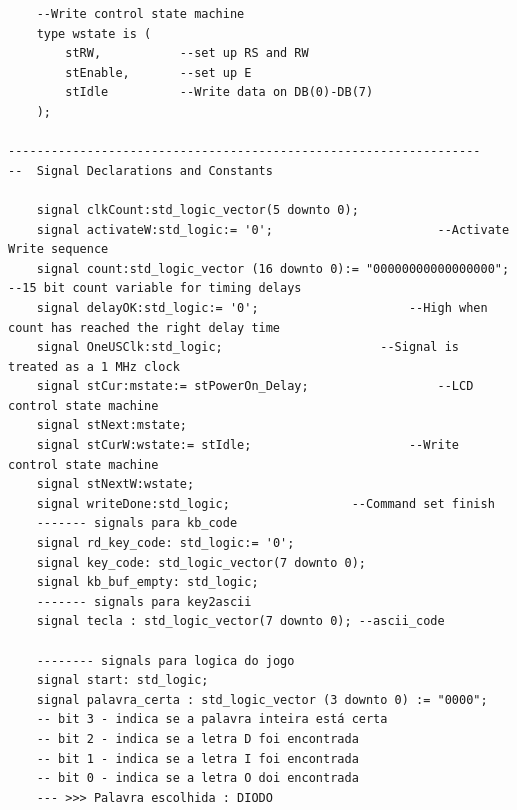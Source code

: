\documentclass[a4paper,12pt,twoside]{article}
\begin{document}
\begin{lstlisting}
	--Write control state machine
	type wstate is (
		stRW,			--set up RS and RW
		stEnable,		--set up E
		stIdle			--Write data on DB(0)-DB(7)
	);

------------------------------------------------------------------
--  Signal Declarations and Constants

    signal clkCount:std_logic_vector(5 downto 0);
    signal activateW:std_logic:= '0';		    			--Activate Write sequence
    signal count:std_logic_vector (16 downto 0):= "00000000000000000";	--15 bit count variable for timing delays
    signal delayOK:std_logic:= '0';						--High when count has reached the right delay time
    signal OneUSClk:std_logic;						--Signal is treated as a 1 MHz clock	
    signal stCur:mstate:= stPowerOn_Delay;					--LCD control state machine
    signal stNext:mstate;			  	
    signal stCurW:wstate:= stIdle; 						--Write control state machine
    signal stNextW:wstate;
    signal writeDone:std_logic;					--Command set finish
    ------- signals para kb_code
    signal rd_key_code: std_logic:= '0';
    signal key_code: std_logic_vector(7 downto 0);
    signal kb_buf_empty: std_logic;
	------- signals para key2ascii
    signal tecla : std_logic_vector(7 downto 0); --ascii_code
	
	-------- signals para logica do jogo
    signal start: std_logic;
    signal palavra_certa : std_logic_vector (3 downto 0) := "0000";
	-- bit 3 - indica se a palavra inteira está certa
	-- bit 2 - indica se a letra D foi encontrada
	-- bit 1 - indica se a letra I foi encontrada
	-- bit 0 - indica se a letra O doi encontrada
	--- >>> Palavra escolhida : DIODO
	

\end{lstlisting}
\end{document}
